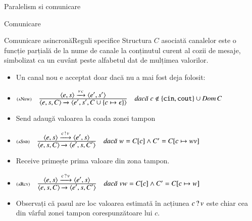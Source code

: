 \documentclass[xcolor=pdftex,romanian,colorlinks]{beamer}
\begin{document}
\begin{section}{Paralelism si comunicare}
\begin{subsection}{Comunicare}
\begin{frame}{Comunicare asincronă}{Reguli specifice}
Structura $C$ asociată canalelor este o funcție parțială de la nume de canale la conținutul curent al cozii de mesaje, simbolizat ca un cuvânt peste alfabetul dat de mulțimea valorilor.
\begin{itemize}
\item Un canal nou e acceptat doar dacă nu a mai fost deja folosit:
\item[] $\reg[aNew]{\Ss{\c{e,s,C}}{\c{e',s',C\cup \{c\mapsto \epsilon\}}}}{\Ss[\Anew{c}]{\c{e,s}}{\c{e',s'}}}{c\not\in \{\Scin,\Scout\}\cup \Dom C}$
\item Send adaugă valoarea la coada zonei tampon
\item[] $\reg[aSnd]{\Ss{\c{e,s,C}}{\c{e',s,C'}}}{\Ss[\Asnd{c}{v}]{\c{e,s}}{\c{e',s}} }{w = C[c] \wedge C' = C[c\mapsto w v]}$
\item Receive primește prima valoare din zona tampon.
\item[] $\reg[aRcv]{\Ss{\c{e,s,C}}{\c{e',s,C'}}}{\Ss[\Arcv{c}{v}]{\c{e,s}}{\c{e',s}}}{v w = C[c] \wedge C' = C[c\mapsto w]}$
\item  Observați că pasul are loc  valoarea estimată în acțiunea $c\,?\,v$ este chiar cea din vârful zonei tampon corespunzătoare lui $c$.
\end{itemize}
\end{frame}



\end{subsection}
\end{section}
\end{document}
